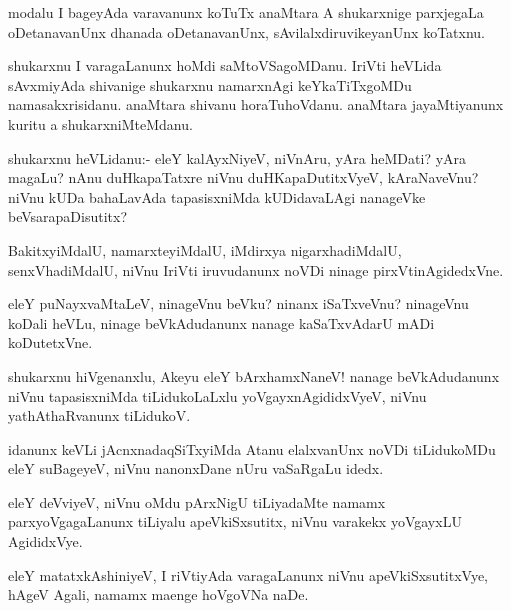 \documentclass{article}
\begin{document}
\begin{mn}
modalu I bageyAda varavanunx koTuTx anaMtara A shukarxnige parxjegaLa
oDetanavanUnx dhanada oDetanavanUnx, sAvilalxdiruvikeyanUnx koTatxnu.
\end{mn}

\begin{mn}
shukarxnu I varagaLanunx hoMdi saMtoVSagoMDanu. IriVti heVLida
sAvxmiyAda shivanige shukarxnu namarxnAgi keYkaTiTxgoMDu
namasakxrisidanu. anaMtara shivanu horaTuhoVdanu. anaMtara
jayaMtiyanunx kuritu a shukarxniMteMdanu.
\end{mn}

\begin{mn}
shukarxnu heVLidanu:- eleY kalAyxNiyeV, niVnAru, yAra heMDati? yAra
magaLu? nAnu duHkapaTatxre niVnu duHKapaDutitxVyeV, kAraNaveVnu? niVnu
kUDa bahaLavAda tapasisxniMda kUDidavaLAgi nanageVke beVsarapaDisutitx?
\end{mn}

\begin{mn}
BakitxyiMdalU, namarxteyiMdalU, iMdirxya nigarxhadiMdalU,
senxVhadiMdalU, niVnu IriVti iruvudanunx noVDi ninage pirxVtinAgidedxVne.
\end{mn}

\begin{mn}
eleY puNayxvaMtaLeV, ninageVnu beVku? ninanx iSaTxveVnu? ninageVnu
koDali heVLu, ninage beVkAdudanunx nanage kaSaTxvAdarU mADi koDutetxVne.
\end{mn}

\begin{mn}%
shukarxnu hiVgenanxlu, Akeyu eleY bArxhamxNaneV! nanage beVkAdudanunx
niVnu tapasisxniMda tiLidukoLaLxlu yoVgayxnAgididxVyeV, niVnu
yathAthaRvanunx tiLidukoV.
\end{mn}

\begin{mn}
idanunx keVLi jAcnxnadaqSiTxyiMda Atanu elalxvanUnx noVDi tiLidukoMDu
eleY suBageyeV, niVnu nanonxDane nUru vaSaRgaLu idedx.
\end{mn}

\begin{mn}
eleY deVviyeV, niVnu oMdu pArxNigU tiLiyadaMte namamx
parxyoVgagaLanunx tiLiyalu apeVkiSxsutitx, niVnu varakekx yoVgayxLU AgididxVye.
\end{mn}

\begin{mn}
eleY matatxkAshiniyeV, I riVtiyAda varagaLanunx niVnu
apeVkiSxsutitxVye, hAgeV Agali, namamx maenge hoVgoVNa naDe.
\end{mn}
\end{document}
